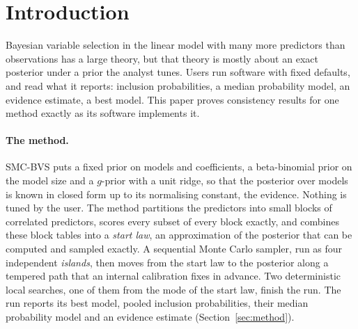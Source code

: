 \section{Introduction}\label{sec:intro}

Bayesian variable selection in the linear model with many more predictors than observations has a large theory, but
that theory is mostly about an exact posterior under a prior the analyst tunes. Users run software with fixed defaults,
and read what it reports: inclusion probabilities, a median probability model, an evidence estimate, a best model. This
paper proves consistency results for one method exactly as its software implements it.

\paragraph{The method.} SMC-BVS puts a fixed prior on models and coefficients, a beta-binomial prior on the model size
\citep{ScottBerger2010} and a $g$-prior with a unit ridge, so that the posterior over models is known in closed form up to
its normalising constant, the evidence. Nothing is tuned by the user. The method partitions the predictors into small
blocks of correlated predictors, scores every subset of every block exactly, and combines these block tables into a
\emph{start law}, an approximation of the posterior that can be computed and sampled exactly. A sequential Monte Carlo
sampler, run as four independent \emph{islands}, then moves from the start law to the posterior along a tempered path
that an internal calibration fixes in advance. Two deterministic local searches, one of them from the mode of the start
law, finish the run. The run reports its best model, pooled inclusion probabilities, their median probability model and
an evidence estimate (Section~\ref{sec:method}).

